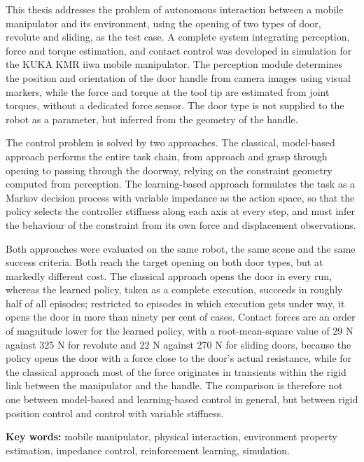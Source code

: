 
This thesis addresses the problem of autonomous interaction between a mobile manipulator and its
environment, using the opening of two types of door, revolute and sliding, as the test case. A
complete system integrating perception, force and torque estimation, and contact control was
developed in simulation for the KUKA KMR iiwa mobile manipulator. The perception module
determines the position and orientation of the door handle from camera images using visual
markers, while the force and torque at the tool tip are estimated from joint torques, without a
dedicated force sensor. The door type is not supplied to the robot as a parameter, but inferred
from the geometry of the handle.

The control problem is solved by two approaches. The classical, model-based approach performs the
entire task chain, from approach and grasp through opening to passing through the doorway,
relying on the constraint geometry computed from perception. The learning-based approach
formulates the task as a Markov decision process with variable impedance as the action space, so
that the policy selects the controller stiffness along each axis at every step, and must infer
the behaviour of the constraint from its own force and displacement observations.

Both approaches were evaluated on the same robot, the same scene and the same success criteria.
Both reach the target opening on both door types, but at markedly different cost. The classical
approach opens the door in every run, whereas the learned policy, taken as a complete execution,
succeeds in roughly half of all episodes; restricted to episodes in which execution gets under
way, it opens the door in more than ninety per cent of cases. Contact forces are an order of
magnitude lower for the learned policy, with a root-mean-square value of 29 N against 325 N for
revolute and 22 N against 270 N for sliding doors, because the policy opens the door with a force
close to the door's actual resistance, while for the classical approach most of the force
originates in transients within the rigid link between the manipulator and the handle. The
comparison is therefore not one between model-based and learning-based control in general, but
between rigid position control and control with variable stiffness.

\vspace{8mm}
\noindent\textbf{Key words:} mobile manipulator, physical interaction, environment property
estimation, impedance control, reinforcement learning, simulation.
\clearpage